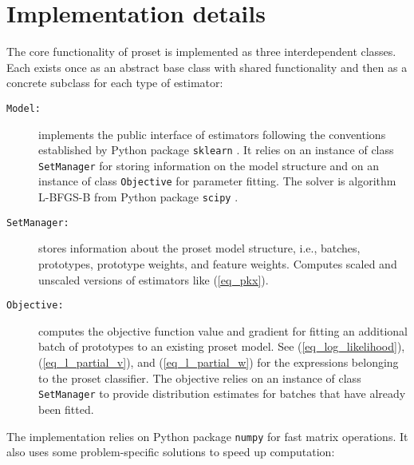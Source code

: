 \section{Implementation details}
\label{sec_implementation}
%
The core functionality of proset is implemented as three interdependent classes.
Each exists once as an abstract base class with shared functionality and then as a concrete subclass for each type of estimator:
%
\begin{description}
\item[\texttt{Model:}] implements the public interface of estimators following the conventions established by Python package \texttt{sklearn} \cite{Pedregosa_11}.
It relies on an instance of class \texttt{SetManager} for storing information on the model structure and on an instance of class \texttt{Objective} for parameter fitting.
The solver is algorithm L-BFGS-B \cite{Byrd_95} from Python package \texttt{scipy} \cite{Virtanen_20}.
%
\item[\texttt{SetManager:}] stores information about the proset model structure, i.e., batches, prototypes, prototype weights, and feature weights.
Computes scaled and unscaled versions of estimators like (\ref{eq_pkx}).
%
\item[\texttt{Objective:}] computes the objective function value and gradient for fitting an additional batch of prototypes to an existing proset model.
See (\ref{eq_log_likelihood}), (\ref{eq_l_partial_v}), and (\ref{eq_l_partial_w}) for the expressions belonging to the proset classifier.
The objective relies on an instance of class \texttt{SetManager} to provide distribution estimates for batches that have already been fitted.
\end{description}
%
The implementation relies on Python package \texttt{numpy} \cite{Harris_20} for fast matrix operations.
It also uses some problem-specific solutions to speed up computation:
%
